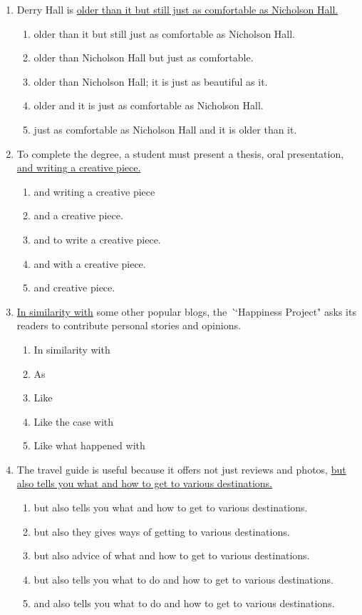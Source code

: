 \begin{enumerate}
\item Derry Hall is \underline{older than it but still just as comfortable as Nicholson Hall.}

\begin{enumerate}[label=(\Alph*)]
\item{older than it but still just as comfortable as Nicholson Hall.}
\item{older than Nicholson Hall but just as comfortable.}
\item{older than Nicholson Hall; it is just as beautiful as it.}
\item{older and it is just as comfortable as Nicholson Hall.}
\item{just as comfortable as Nicholson Hall and it is older than it.}
\end{enumerate}

\bigskip
\item To complete the degree, a student must present a thesis, oral presentation, \ul{and writing a creative piece.}

\begin{enumerate}[label=(\Alph*)]
\item and writing a creative piece
\item and a creative piece.
\item and to write a creative piece.
\item and with a creative piece.
\item and creative piece.
\end{enumerate}

\bigskip
\item \underline{In similarity with} some other popular blogs, the \textit``Happiness Project" asks its readers to contribute personal stories and opinions.
\begin{enumerate}[label=(\Alph*)]
\item In similarity with
\item As
\item Like
\item Like the case with
\item Like what happened with
\end{enumerate}

\newpage
\item The travel guide is useful because it offers not just reviews and photos, \ul{but also tells you what and how to get to various destinations.}
\begin{enumerate}[label=(\Alph*)]
\item but also tells you what and how to get to various destinations.
\item but also they gives ways of getting to various destinations.
\item but also advice of what and how to get to various destinations.
\item but also tells you what to do and how to get to various destinations.
\item and also tells you what to do and how to get to various destinations.
\end{enumerate}


\end{enumerate}

